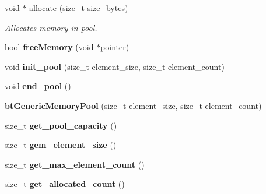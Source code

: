 \begin{DoxyCompactItemize}
\item 
void $\ast$ \hyperlink{classbtGenericMemoryPool_acd47d75d6fbd7dbf6f0d7849e0bd9ec1}{allocate} (size\+\_\+t size\+\_\+bytes)
\begin{DoxyCompactList}\small\item\em Allocates memory in pool. \end{DoxyCompactList}\item 
\mbox{\label{classbtGenericMemoryPool_a5102aa7ec9a967db95ea1cb12fcb1e12}} 
bool {\bfseries free\+Memory} (void $\ast$pointer)
\item 
\mbox{\label{classbtGenericMemoryPool_a737c1ad587dc82b2fac01096ac0a7b41}} 
void {\bfseries init\+\_\+pool} (size\+\_\+t element\+\_\+size, size\+\_\+t element\+\_\+count)
\item 
\mbox{\label{classbtGenericMemoryPool_a7830d0b91b596c10b52da3b4ade2e41d}} 
void {\bfseries end\+\_\+pool} ()
\item 
\mbox{\label{classbtGenericMemoryPool_a2507290a6ad7e0e04f81da3a7d97caeb}} 
{\bfseries bt\+Generic\+Memory\+Pool} (size\+\_\+t element\+\_\+size, size\+\_\+t element\+\_\+count)
\item 
\mbox{\label{classbtGenericMemoryPool_acf029799be7eb09e276e27bb2296e14a}} 
size\+\_\+t {\bfseries get\+\_\+pool\+\_\+capacity} ()
\item 
\mbox{\label{classbtGenericMemoryPool_a728395d36923dd3f480d0320dfb0a3f2}} 
size\+\_\+t {\bfseries gem\+\_\+element\+\_\+size} ()
\item 
\mbox{\label{classbtGenericMemoryPool_ad4a523dabab835e0e786661b628dbb6b}} 
size\+\_\+t {\bfseries get\+\_\+max\+\_\+element\+\_\+count} ()
\item 
\mbox{\label{classbtGenericMemoryPool_a6e483e9117e17c8df23ba42a12283ea6}} 
size\+\_\+t {\bfseries get\+\_\+allocated\+\_\+count} ()
\item 
\mbox{\label{classbtGenericMemoryPool_a969d29bf5f9b52a8d9d34ed9f529e3f9}} 

\end{DoxyCompactItemize}
